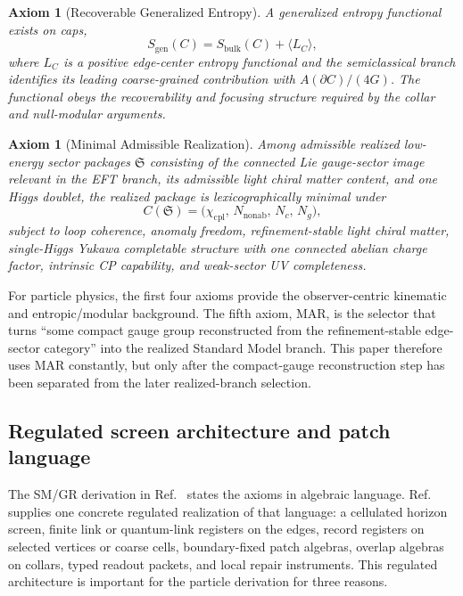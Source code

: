 \documentclass[11pt]{article}
\newtheorem{axiom}[theorem]{Axiom}
\begin{document}
\begin{axiom}[Recoverable Generalized Entropy]\label{ax:entropy}
A generalized entropy functional exists on caps,
\[
S_{\mathrm{gen}}(C)=S_{\mathrm{bulk}}(C)+\langle L_C\rangle,
\]
where \(L_C\) is a positive edge-center entropy functional and the semiclassical branch
identifies its leading coarse-grained contribution with \(A(\partial C)/(4G)\). The functional
obeys the recoverability and focusing structure required by the collar and null-modular
arguments.
\end{axiom}

\begin{axiom}[Minimal Admissible Realization]\label{ax:mar}
Among admissible realized low-energy sector packages \(\mathfrak S\) consisting of the connected
Lie gauge-sector image relevant in the EFT branch, its admissible light chiral matter content,
and one Higgs doublet, the realized package is lexicographically minimal under
\[
C(\mathfrak S)=\bigl(\chi_{\mathrm{cpl}},\,N_{\mathrm{nonab}},\,N_c,\,N_g\bigr),
\]
subject to loop coherence, anomaly freedom, refinement-stable light chiral matter,
single-Higgs Yukawa completable structure with one connected abelian charge factor, intrinsic
CP capability, and weak-sector UV completeness.
\end{axiom}

For particle physics, the first four axioms provide the observer-centric kinematic and
entropic/modular background. The fifth axiom, MAR, is the selector that turns ``some compact
gauge group reconstructed from the refinement-stable edge-sector category'' into the realized
Standard Model branch. This paper therefore uses MAR constantly, but only after the
compact-gauge reconstruction step has been separated from the later realized-branch
selection.

\subsection{Regulated screen architecture and patch language}

The SM/GR derivation in Ref.~\cite{ophcompact}
states the axioms in algebraic language. Ref.~\cite{ophmicrophysics} supplies one concrete regulated realization of that language: a cellulated horizon screen,
finite link or quantum-link registers on the edges, record registers on selected vertices or
coarse cells, boundary-fixed patch algebras, overlap algebras on collars, typed readout packets,
and local repair instruments. This regulated architecture is important for the particle derivation
for three reasons.
\end{document}
